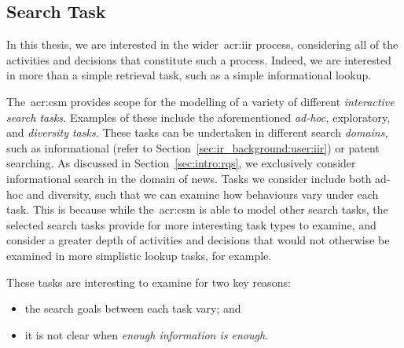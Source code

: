 \subsection{Search Task}\label{sec:csm:assumptions:task}
In this thesis, we are interested in the wider~\gls{acr:iir} process, considering all of the activities and decisions that constitute such a process. Indeed, we are interested in more than a simple retrieval task, such as a simple informational lookup.

The~\gls{acr:csm} provides scope for the modelling of a variety of different \emph{interactive search tasks.} Examples of these include the aforementioned \emph{ad-hoc,} exploratory, and \emph{diversity tasks.} These tasks can be undertaken in different search \emph{domains,} such as informational (refer to Section~\ref{sec:ir_background:user:iir}) or patent searching. As discussed in Section~\ref{sec:intro:rqs}, we exclusively consider informational search in the domain of news. Tasks we consider include both ad-hoc and diversity, such that we can examine how behaviours vary under each task. This is because while the~\gls{acr:csm} is able to model other search tasks, the selected search tasks provide for more interesting task types to examine, and consider a greater depth of activities and decisions that would not otherwise be examined in more simplistic lookup tasks, for example.

%

These tasks are interesting to examine for two key reasons:

\begin{itemize}
    \item{the search goals between each task vary; and}
    \item{it is not clear when \emph{enough information is enough.}}
\end{itemize}

